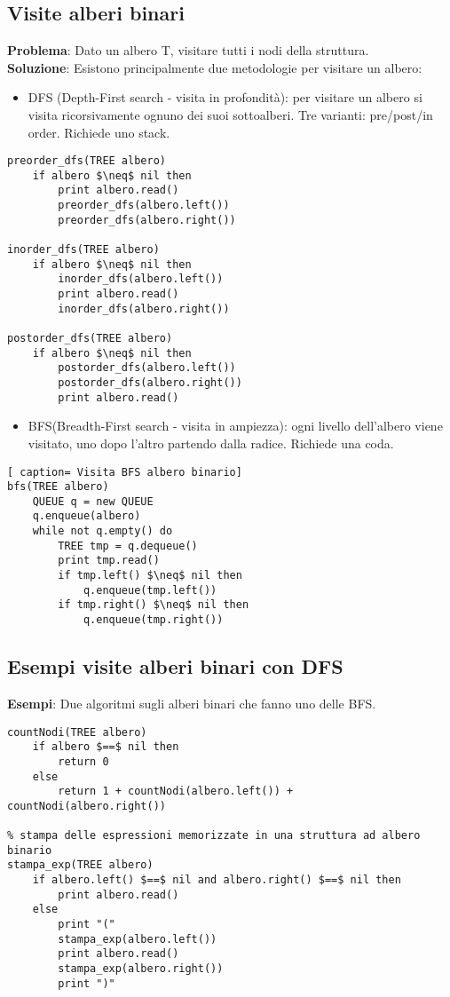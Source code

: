 \documentclass[../cheatSheetAlgoritmi.tex]{subfiles}
\begin{document}
\subsection{Visite alberi binari}
\textbf{Problema}: Dato un albero T, visitare tutti i nodi della struttura.\\
\textbf{Soluzione}: Esistono principalmente due metodologie per visitare un albero:
\begin{itemize}
	\item DFS (Depth-First search - visita in profondità): per visitare un albero si visita ricorsivamente ognuno dei suoi sottoalberi. Tre varianti: pre/post/in order. Richiede uno stack.
\end{itemize}
\begin{lstlisting}[caption= Visita DFS albero bin]
preorder_dfs(TREE albero)
	if albero $\neq$ nil then
		print albero.read()
		preorder_dfs(albero.left())
		preorder_dfs(albero.right())

inorder_dfs(TREE albero)
	if albero $\neq$ nil then
		inorder_dfs(albero.left())
		print albero.read()
		inorder_dfs(albero.right())

postorder_dfs(TREE albero)
	if albero $\neq$ nil then
		postorder_dfs(albero.left())
		postorder_dfs(albero.right())
		print albero.read()
\end{lstlisting}
\begin{itemize}
 	\item BFS(Breadth-First search - visita in ampiezza): ogni livello dell'albero viene visitato, uno dopo l'altro partendo dalla radice. Richiede una coda. 
\end{itemize}
\begin{lstlisting}[ caption= Visita BFS albero binario]
bfs(TREE albero)
	QUEUE q = new QUEUE
	q.enqueue(albero)
	while not q.empty() do
		TREE tmp = q.dequeue()
		print tmp.read()
		if tmp.left() $\neq$ nil then
			q.enqueue(tmp.left())
		if tmp.right() $\neq$ nil then
			q.enqueue(tmp.right())
\end{lstlisting}

\subsection{Esempi visite alberi binari con DFS}
\textbf{Esempi}: Due algoritmi sugli alberi binari che fanno uno delle BFS.
\begin{lstlisting}[caption= Esempi DFS alberi binari]
% conta i nodi di un albero binario
countNodi(TREE albero)
	if albero $==$ nil then
		return 0
	else 
		return 1 + countNodi(albero.left()) + countNodi(albero.right())

% stampa delle espressioni memorizzate in una struttura ad albero binario
stampa_exp(TREE albero)
	if albero.left() $==$ nil and albero.right() $==$ nil then
		print albero.read()
	else 
		print "("
		stampa_exp(albero.left())
		print albero.read()
		stampa_exp(albero.right())
		print ")"
\end{lstlisting}
\end{document}
